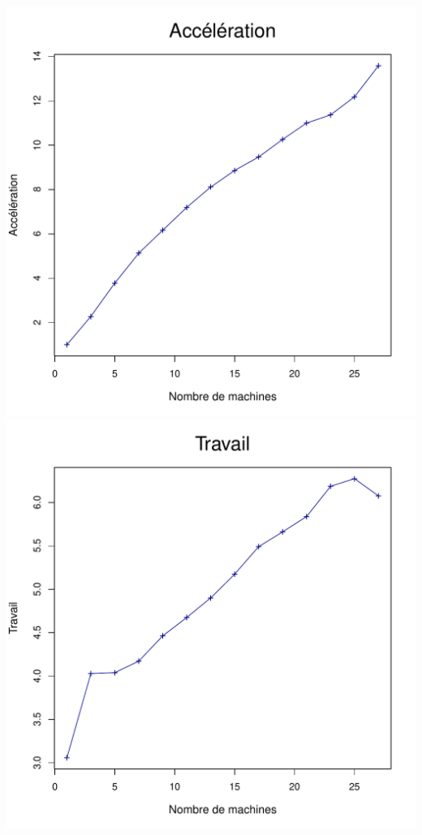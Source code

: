 \documentclass[a4paper, 11pt, titlepage]{article}
\begin{document}
\begin{center}
    \includegraphics[scale=0.45]{res/sujet_makefiles_matrix_Makefile_nth1_acc.pdf}
    \includegraphics[scale=0.45]{res/sujet_makefiles_matrix_Makefile_nth1_work.pdf}
\end{center}
\end{document}
